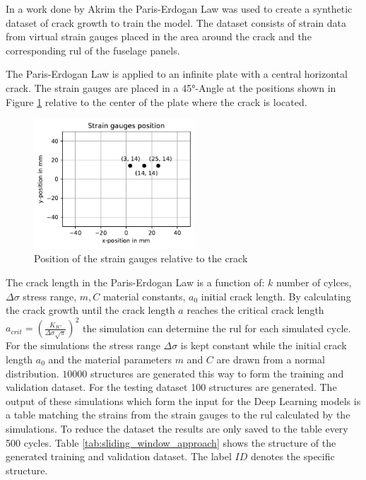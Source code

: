 \documentclass[conference]{IEEEtran}
\begin{document}
In a work done by Akrim \cite{Akrim} the Paris-Erdogan Law \cite{Paris1963} was used to create a synthetic dataset of crack growth to train the model. The dataset consists of strain data from virtual strain gauges placed in the area around the crack and the corresponding \gls{rul} of the fuselage panels.

The Paris-Erdogan Law is applied to an infinite plate with a central horizontal crack. The strain gauges are placed in a 45°-Angle at the positions shown in Figure \ref{fig:strain_gauge_positions} relative to the center of the plate where the crack is located.

\begin{figure}[htp]
	\centering
	\includegraphics[width=6cm]{python/strain_gauges_position.pdf}
	\caption{Position of the strain gauges relative to the crack}
	\label{fig:strain_gauge_positions}
\end{figure}

The crack length in the Paris-Erdogan Law is a function of: $k$ number of cylces, $\Delta \sigma$ stress range, $m, C$ material constants, $a_0$ initial crack length. By calculating the crack growth until the crack length $a$ reaches the critical crack length $a_{crit}=(\frac{K_{IC}}{\Delta \sigma \sqrt{\pi}})^2$ the simulation can determine the \gls{rul} for each simulated cycle. For the simulations the stress range $\Delta \sigma$ is kept constant while the initial crack length $a_0$ and the material parameters $m$ and $C$ are drawn from a normal distribution. $ 10000 $ structures are generated this way to form the training and validation dataset. For the testing dataset 100 structures are generated. The output of these simulations which form the input for the Deep Learning models is a table matching the strains from the strain gauges to the \gls{rul} calculated by the simulations. To reduce the dataset the results are only saved to the table every 500 cycles. Table \ref{tab:sliding_window_approach} shows the structure of the generated training and validation dataset. The label $ ID $ denotes the specific structure.
\end{document}

